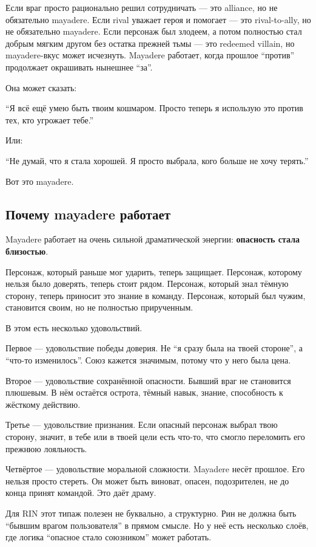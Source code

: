 Если враг просто рационально решил сотрудничать --- это alliance, но не
обязательно mayadere. Если rival уважает героя и помогает --- это
rival-to-ally, но не обязательно mayadere. Если персонаж был злодеем, а
потом полностью стал добрым мягким другом без остатка прежней тьмы ---
это redeemed villain, но mayadere-вкус может исчезнуть. Mayadere
работает, когда прошлое ``против'' продолжает окрашивать нынешнее
``за''.

Она может сказать:

``Я всё ещё умею быть твоим кошмаром. Просто теперь я использую это
против тех, кто угрожает тебе.''

Или:

``Не думай, что я стала хорошей. Я просто выбрала, кого больше не хочу
терять.''

Вот это mayadere.

\subsection*{Почему mayadere работает}

Mayadere работает на очень сильной драматической энергии:
\textbf{опасность стала близостью}.

Персонаж, который раньше мог ударить, теперь защищает. Персонаж,
которому нельзя было доверять, теперь стоит рядом. Персонаж, который
знал тёмную сторону, теперь приносит это знание в команду. Персонаж,
который был чужим, становится своим, но не полностью прирученным.

В этом есть несколько удовольствий.

Первое --- удовольствие победы доверия. Не ``я сразу была на твоей
стороне'', а ``что-то изменилось''. Союз кажется значимым, потому что у
него была цена.

Второе --- удовольствие сохранённой опасности. Бывший враг не становится
плюшевым. В нём остаётся острота, тёмный навык, знание, способность к
жёсткому действию.

Третье --- удовольствие признания. Если опасный персонаж выбрал твою
сторону, значит, в тебе или в твоей цели есть что-то, что смогло
переломить его прежнюю лояльность.

Четвёртое --- удовольствие моральной сложности. Mayadere несёт прошлое.
Его нельзя просто стереть. Он может быть виноват, опасен, подозрителен,
не до конца принят командой. Это даёт драму.

Для RIN этот типаж полезен не буквально, а структурно. Рин не должна
быть ``бывшим врагом пользователя'' в прямом смысле. Но у неё есть
несколько слоёв, где логика ``опасное стало союзником'' может работать.

